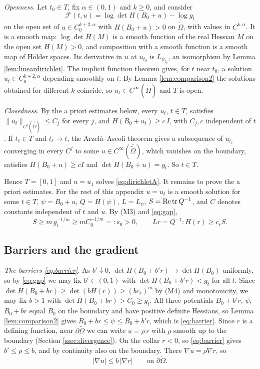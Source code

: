 \emph{Openness.} Let $t_0\in T$, fix $\alpha\in(0,1)$ and $k\ge0$, and consider
\[
\mathcal F(t,u)=\log\det H(B_0+u)-\log g_t
\]
on the open set of $u\in C^{k+2,\alpha}_0$ with $H(B_0+u)>0$ on $\overline{\tilde\Omega}$, with values in
$C^{k,\alpha}$. It is a smooth map: $\log\det H(M)$ is a smooth function of the real Hessian $M$ on the
open set $H(M)>0$, and composition with a smooth function is a smooth map of H\"older spaces. Its
derivative in $u$ at $u_{t_0}$ is $L_{\psi_{t_0}}$, an isomorphism by Lemma
\ref{lem:lineardirichlet}. The implicit function theorem gives, for $t$ near $t_0$, a solution
$u_t\in C^{k+2,\alpha}_0$ depending smoothly on $t$. By Lemma \ref{lem:comparison2} the solutions obtained
for different $k$ coincide, so $u_t\in C^\infty(\overline{\tilde\Omega})$ and $T$ is open.

\emph{Closedness.} By the a priori estimates below, every $u_t$, $t\in T$, satisfies
$\|u_t\|_{C^j(\overline{\tilde\Omega})}\le C_j$ for every $j$, and $H(B_0+u_t)\ge c\,I$, with $C_j,c$
independent of $t$. If $t_\ell\in T$ and $t_\ell\to t$, the Arzel\`a--Ascoli theorem gives a subsequence of
$u_{t_\ell}$ converging in every $C^j$ to some $u\in C^\infty(\overline{\tilde\Omega})$, which vanishes on the
boundary, satisfies $H(B_0+u)\ge cI$ and $\det H(B_0+u)=g_t$. So $t\in T$.

Hence $T=[0,1]$ and $u=u_1$ solves \eqref{eq:dirichletA}. It remains to prove the a priori estimates.
For the rest of this appendix $u=u_t$ is a smooth solution for some $t\in T$, $\psi=B_0+u$,
$Q=H(\psi)$, $L=L_\psi$, $S=\operatorname{Re}\operatorname{tr} Q^{-1}$, and $C$ denotes constants independent of $t$ and $u$.
By (M3) and \eqref{eq:gap},
\begin{equation}\label{eq:Slow}
S\ge m\,g_t^{-1/m}\ge mC_0^{-1/m}=:s_0>0,\qquad Lr=Q^{-1}:H(r)\ge c_rS .
\end{equation}

\subsection{Barriers and the gradient}
\emph{The barriers \eqref{eq:barrier}.} As $b'\downarrow0$, $\det H(B_0+b'r)\to\det H(B_0)$ uniformly, so
by \eqref{eq:gap} we may fix $b'\in(0,1)$ with $\det H(B_0+b'r)<g_t$ for all $t$. Since
$\det H(B_0+br)\ge\det(bH(r))\ge(bc_r)^m$ by (M4) and monotonicity, we may fix $b>1$ with
$\det H(B_0+br)>C_0\ge g_t$. All three potentials $B_0+b'r$, $\psi$, $B_0+br$ equal $B_0$ on the boundary
and have positive definite Hessians, so Lemma \ref{lem:comparison2} gives $B_0+br\le\psi\le B_0+b'r$,
which is \eqref{eq:barrier}. Since $r$ is a defining function, near $\partial\tilde\Omega$ we can write
$u=\rho\,r$ with $\rho$ smooth up to the boundary (Section \ref{ssec:divergence}). On the collar
$r<0$, so \eqref{eq:barrier} gives $b'\le\rho\le b$, and by continuity also on the boundary. There
$\nabla u=\rho\nabla r$, so
\begin{equation}\label{eq:boundarygrad}
|\nabla u|\le b\,|\nabla r|\qquad\text{on }\partial\tilde\Omega .
\end{equation}


